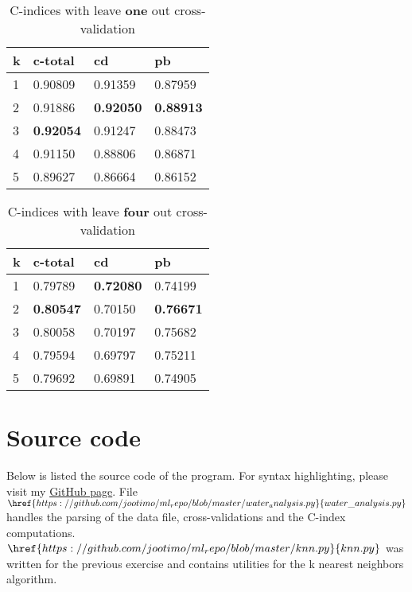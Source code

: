 \documentclass[a4paper]{article}
\begin{document}
\begin{table}[h]
\centering
\begin{tabular}{l|l|l|l}
k & c-total & cd & pb \\\hline
1 & 0.90809 & 0.91359 & 0.87959\\
2 & 0.91886 & \textbf{0.92050} & \textbf{0.88913}\\
3 & \textbf{0.92054} & 0.91247 & 0.88473\\
4 & 0.91150 & 0.88806 & 0.86871\\
5 & 0.89627 & 0.86664 & 0.86152\\
\end{tabular}

\caption{C-indices with leave \textbf{one} out cross-validation}
\end{table}


\begin{table}[h]
\centering
\begin{tabular}{l|l|l|l}
k & c-total & cd & pb \\\hline
1 & 0.79789 & \textbf{0.72080} & 0.74199\\
2 & \textbf{0.80547} & 0.70150 & \textbf{0.76671}\\
3 & 0.80058 & 0.70197 & 0.75682\\
4 & 0.79594 & 0.69797 & 0.75211\\
5 & 0.79692 & 0.69891 & 0.74905\\
\end{tabular}

\caption{C-indices with leave \textbf{four} out cross-validation}
\end{table}

\newpage
\section{Source code}
Below is listed the source code of the program. For syntax highlighting, please visit my \href{https://github.com/jootimo/ml_repo}{GitHub page}. File $\href{https://github.com/jootimo/ml_repo/blob/master/water_analysis.py}{water\_analysis.py}$ handles the parsing of the data file, cross-validations and the C-index computations. $\href{https://github.com/jootimo/ml_repo/blob/master/knn.py}{knn.py}$ was written for the previous exercise and contains utilities for the k nearest neighbors algorithm.\\\\


\renewcommand{\sfdefault}{pcr}
\selectfont
\end{document}
